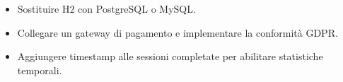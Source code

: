 \begin{itemize}
  \item Sostituire H2 con PostgreSQL o MySQL.


  \item Collegare un gateway di pagamento e implementare la conformità GDPR.

  \item Aggiungere timestamp alle sessioni completate per abilitare statistiche temporali.
\end{itemize}
